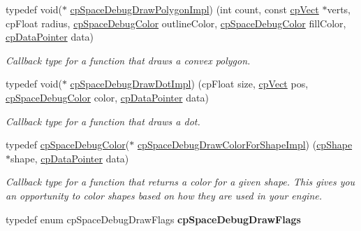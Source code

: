 \begin{DoxyCompactItemize}
typedef void($\ast$ \hyperlink{group__cpSpace_ga2138e846816a1e581a3433740a596ab6}{cp\+Space\+Debug\+Draw\+Polygon\+Impl}) (int count, const \hyperlink{structcpVect}{cp\+Vect} $\ast$verts, cp\+Float radius, \hyperlink{structcpSpaceDebugColor}{cp\+Space\+Debug\+Color} outline\+Color, \hyperlink{structcpSpaceDebugColor}{cp\+Space\+Debug\+Color} fill\+Color, \hyperlink{group__basicTypes_ga2ac2c3c31e21893941f9e4f8ee279447}{cp\+Data\+Pointer} data)
\begin{DoxyCompactList}\small\item\em Callback type for a function that draws a convex polygon. \end{DoxyCompactList}\item 
\mbox{\label{group__cpSpace_gadf9a758a2f1c3b53551829573b722e5a}} 
typedef void($\ast$ \hyperlink{group__cpSpace_gadf9a758a2f1c3b53551829573b722e5a}{cp\+Space\+Debug\+Draw\+Dot\+Impl}) (cp\+Float size, \hyperlink{structcpVect}{cp\+Vect} pos, \hyperlink{structcpSpaceDebugColor}{cp\+Space\+Debug\+Color} color, \hyperlink{group__basicTypes_ga2ac2c3c31e21893941f9e4f8ee279447}{cp\+Data\+Pointer} data)
\begin{DoxyCompactList}\small\item\em Callback type for a function that draws a dot. \end{DoxyCompactList}\item 
\mbox{\label{group__cpSpace_gaba1fec950f2b58c7c72ab5ca553bdf43}} 
typedef \hyperlink{structcpSpaceDebugColor}{cp\+Space\+Debug\+Color}($\ast$ \hyperlink{group__cpSpace_gaba1fec950f2b58c7c72ab5ca553bdf43}{cp\+Space\+Debug\+Draw\+Color\+For\+Shape\+Impl}) (\hyperlink{structcpShape}{cp\+Shape} $\ast$shape, \hyperlink{group__basicTypes_ga2ac2c3c31e21893941f9e4f8ee279447}{cp\+Data\+Pointer} data)
\begin{DoxyCompactList}\small\item\em Callback type for a function that returns a color for a given shape. This gives you an opportunity to color shapes based on how they are used in your engine. \end{DoxyCompactList}\item 
\mbox{\label{group__cpSpace_gaa625807338fd5ebd8f61463dead0c32b}} 
typedef enum cp\+Space\+Debug\+Draw\+Flags {\bfseries cp\+Space\+Debug\+Draw\+Flags}
\item 
\mbox{\label{group__cpSpace_gabb44b3d40332bc5965e8dbd515caa71a}} 

\end{DoxyCompactItemize}
